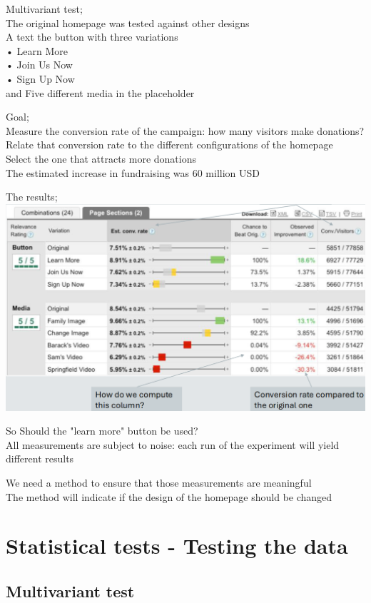 \documentclass[]{project_plan}
\begin{document}
Multivariant test;\\
The original homepage was tested against other designs\\
A text the button with three variations\\
• Learn More\\
• Join Us Now\\
• Sign Up Now\\
and Five different media in the placeholder

Goal;\\
Measure the conversion rate of the campaign: how many visitors make donations?\\
Relate that conversion rate to the different configurations of the homepage\\
Select the one that attracts more donations\\
The estimated increase in fundraising was 60 million USD

\newpage

The results;\\
\includegraphics[width=\linewidth]{case_study_results.png}

So Should the "learn more" button be used?\\
All measurements are subject to noise: each run of the experiment will yield different results

We need a method to ensure that those measurements are meaningful\\
The method will indicate if the design of the homepage should be changed

\section{Statistical tests - Testing the data}

\subsection{Multivariant test}
\end{document}
